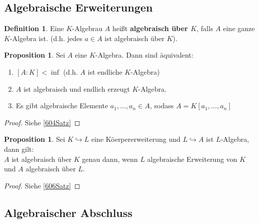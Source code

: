 \documentclass[10pt,a4paper]{article}
\newcounter{thm}[section]
\theoremstyle{definition}
\newtheorem{definition}[thm]{Definition}
\newtheorem{prop}[thm]{Proposition}
\theoremstyle{plain}
\theoremstyle{remark}
\begin{document}
\subsection{Algebraische Erweiterungen}
\begin{definition}
	Eine $K$-Algebrau $A$ heißt \textbf{algebraisch über $K$}, falls $A$ eine ganze $K$-Algebra ist. (d.h. jedes $a\in A$ ist algebraisch über $K$).
\end{definition}
\begin{prop}
	Sei $A$ eine $K$-Algebra. Dann sind äquivalent:
	\begin{enumerate}
		\item $[A:K]<\inf$ (d.h. $A$ ist endliche $K$-Algebra)
		\item $A$ ist algebraisch und endlich erzeugt $K$-Algebra.
		\item Es gibt algebraische Elemente $a_1,...,a_n\in A$, sodass $A=K[a_1,...,a_n]$
	\end{enumerate}
\end{prop}
\begin{proof}
	Siehe \ref{604Satz}
\end{proof}

 \begin{prop}
 	Sei $K\hookrightarrow L$ eine Köerpererweiterung und $L\hookrightarrow A$ ist $L$-Algebra, dann gilt:\\
 	$A$ ist algebraisch über $K$ genau dann, wenn $L$ algebraische Erweiterung von $K$ und $A$ algebraisch über $L$.
 \end{prop}
\begin{proof}
	Siehe \ref{606Satz}
\end{proof}

\subsection{Algebraischer Abschluss}
\end{document}
